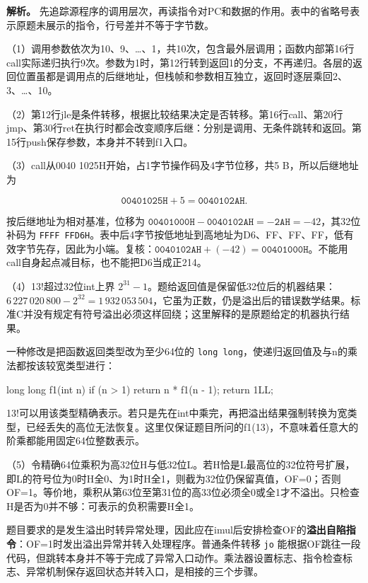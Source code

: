 \textbf{解析。} 先追踪源程序的调用层次，再读指令对PC和数据的作用。表中的省略号表示原题未展示的指令，行号差并不等于字节数。

（1）调用参数依次为10、9、\ldots、1，共10次，包含最外层调用；函数内部第16行call实际递归执行9次。参数为1时，第12行转到返回1的分支，不再递归。各层的返回位置虽都是调用点的后继地址，但栈帧和参数相互独立，返回时逐层乘回2、3、\ldots、10。

（2）第12行jle是条件转移，根据比较结果决定是否转移。第16行call、第20行jmp、第30行ret在执行时都会改变顺序后继：分别是调用、无条件跳转和返回。第15行push保存参数，本身并不转到f1入口。

（3）call从0040 1025H开始，占1字节操作码及4字节位移，共5 B，所以后继地址为

\[
\mathtt{00401025H}+5=\mathtt{0040102AH}.
\]

按后继地址为相对基准，位移为 \(\mathtt{00401000H}-\mathtt{0040102AH}=-\mathtt{2AH}=-42\)，其32位补码为 \texttt{FFFF FFD6H}。表中后4字节按低地址到高地址为D6、FF、FF、FF，低有效字节先存，因此为小端。复核：\(\mathtt{0040102AH}+(-42)=\mathtt{00401000H}\)。不能用call自身起点减目标，也不能把D6当成正214。

（4）13!超过32位int上界 \(2^{31}-1\)。题给返回值是保留低32位后的机器结果：\(6\,227\,020\,800-2^{32}=1\,932\,053\,504\)，它虽为正数，仍是溢出后的错误数学结果。标准C并没有规定有符号溢出必须这样回绕；这里解释的是原题给定的机器执行结果。

一种修改是把函数返回类型改为至少64位的 \texttt{long long}，使递归返回值及与n的乘法都按该较宽类型进行：

\begin{codeblock}[language=C]
long long f1(int n) {
    if (n > 1)
        return n * f1(n - 1);
    return 1LL;
}
\end{codeblock}

13!可以用该类型精确表示。若只是先在int中乘完，再把溢出结果强制转换为宽类型，已经丢失的高位无法恢复。这里仅保证题目所问的f1(13)，不意味着任意大的阶乘都能用固定64位整数表示。

（5）令精确64位乘积为高32位H与低32位L。若H恰是L最高位的32位符号扩展，即L的符号位为0时H全0、为1时H全1，则截为32位仍保留真值，OF=0；否则OF=1。等价地，乘积从第63位至第31位的高33位必须全0或全1才不溢出。只检查H是否为0并不够：可表示的负积需要H全1。

题目要求的是发生溢出时转异常处理，因此应在imul后安排检查OF的\textbf{溢出自陷指令}：OF=1时发出溢出异常并转入处理程序。普通条件转移 \texttt{jo} 能根据OF跳往一段代码，但跳转本身并不等于完成了异常入口动作。乘法器设置标志、指令检查标志、异常机制保存返回状态并转入口，是相接的三个步骤。

